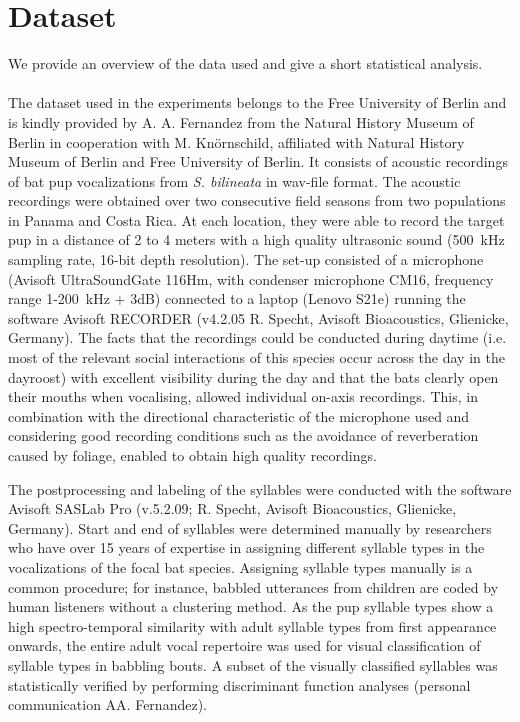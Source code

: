 \chapter{Dataset}
\label{ch:dataset}
We provide an overview of the data used and give a short statistical analysis.\\\\

The dataset used in the experiments belongs to the Free University of Berlin and is kindly provided by A. A. Fernandez from the Natural History Museum of Berlin in cooperation with M. Knörnschild, affiliated with Natural History Museum of Berlin and Free University of Berlin. It consists of acoustic recordings of bat pup vocalizations from \emph{S. bilineata} in wav-file format. The acoustic recordings were obtained over two consecutive field seasons from two populations in Panama and Costa Rica.
At each location, they were able to record the target pup in a distance of 2 to 4 meters with a high quality ultrasonic sound (\SI{500}{\kHz} sampling rate, 16-bit depth resolution). The set-up consisted of a microphone (Avisoft UltraSoundGate 116Hm, with condenser microphone CM16, frequency range 1-\SI{200}{\kHz} + 3dB) connected to a laptop (Lenovo S21e) running the software Avisoft RECORDER (v4.2.05 R. Specht, Avisoft Bioacoustics, Glienicke, Germany).
The facts that the recordings could be conducted during daytime (i.e. most of the relevant social interactions of this species occur across the day in the dayroost) with excellent visibility during the day and that the bats clearly open their mouths when vocalising, allowed individual on-axis recordings.
This, in combination with the directional characteristic of the microphone used and considering good recording conditions such as the avoidance of reverberation caused by foliage, enabled to obtain high quality recordings.

The postprocessing and labeling of the syllables were conducted with the software Avisoft SASLab Pro (v.5.2.09; R. Specht, Avisoft Bioacoustics, Glienicke, Germany).
Start and end of syllables were determined manually by researchers who have over 15 years of expertise in assigning different syllable types in the vocalizations of the focal bat species.
Assigning syllable types manually is a common procedure; for instance, babbled utterances from children are coded by human listeners without a clustering method.
As the pup syllable types show a high spectro-temporal similarity with adult syllable types from first appearance onwards, the entire adult vocal repertoire was used for visual classification of syllable types in babbling bouts.
A subset of the visually classified syllables was statistically verified by performing discriminant function analyses (personal communication AA. Fernandez).

